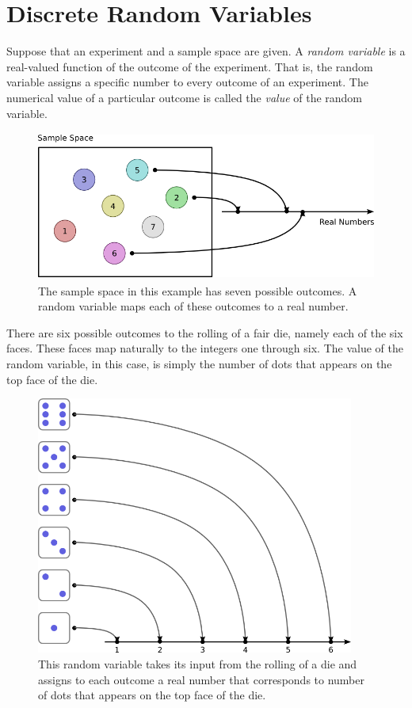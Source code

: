 \chapter{Discrete Random Variables}
\label{chapter:DiscreteRandomVariables}
Suppose that an experiment and a sample space are given.
A \emph{random variable} is a real-valued function of the outcome of the experiment.
That is, the random variable assigns a specific number to every outcome of an experiment.
The numerical value of a particular outcome is called the \emph{value} of the random variable.

\begin{figure}[ht]
\begin{center}
\includegraphics[height=4.92cm]{Figures/5Chapter/rv}
\caption{The sample space in this example has seven possible outcomes.  A random variable maps each of these outcomes to a real number.}
\end{center}
\end{figure}

\begin{example}
There are six possible outcomes to the rolling of a fair die, namely each of the six faces.
These faces map naturally to the integers one through six.
The value of the random variable, in this case, is simply the number of dots that appears on the top face of the die.

\begin{figure}[ht]
\begin{center}
\includegraphics[height=8.5cm]{Figures/5chapter/rvdices}
\caption{This random variable takes its input from the rolling of a die and assigns to each outcome a real number that corresponds to number of dots that appears on the top face of the die.}
\end{center}
\end{figure}
\end{example}

